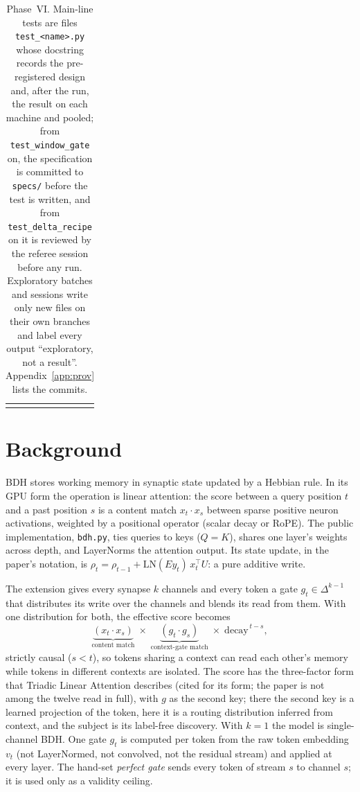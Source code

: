 \documentclass[11pt]{article}
\begin{document}
{\begin{longtable}{@{}l>{\raggedright\arraybackslash}p{0.27\linewidth}>{\raggedright\arraybackslash}p{0.36\linewidth}r@{}}
\bottomrule
\caption{Phase~VI. Main-line tests are files \texttt{test\_<name>.py} whose docstring records the pre-registered design and, after the run, the result on each machine and pooled; from \texttt{test\_window\_gate} on, the specification is committed to \texttt{specs/} before the test is written, and from \texttt{test\_delta\_recipe} on it is reviewed by the referee session before any run. Exploratory batches and sessions write only new files on their own branches and label every output ``exploratory, not a result''. Appendix~\ref{app:prov} lists the commits.}
\label{tab:index}
\end{longtable}}

\section{Background}
\label{sec:background}

BDH \cite{bdh} stores working memory in synaptic state updated by a Hebbian rule. In its GPU form the operation is linear attention: the score between a query position $t$ and a past position $s$ is a content match $x_t \cdot x_s$ between sparse positive neuron activations, weighted by a positional operator (scalar decay or RoPE). The public implementation, \texttt{bdh.py}, ties queries to keys ($Q = K$), shares one layer's weights across depth, and LayerNorms the attention output. Its state update, in the paper's notation, is $\rho_{t} = \rho_{t-1} + \mathrm{LN}(E y_{t})\, x_{t}^{\top} U$: a pure additive write.

The extension gives every synapse $k$ channels and every token a gate $g_t \in \Delta^{k-1}$ that distributes its write over the channels and blends its read from them. With one distribution for both, the effective score becomes
\begin{equation}
\underbrace{(x_t \cdot x_s)}_{\text{content match}}\;\times\;\underbrace{(g_t \cdot g_s)}_{\text{context-gate match}}\;\times\;\mathrm{decay}^{\,t-s},
\label{eq:score}
\end{equation}
strictly causal ($s < t$), so tokens sharing a context can read each other's memory while tokens in different contexts are isolated. The score has the three-factor form that Triadic Linear Attention \cite{tla} describes (cited for its form; the paper is not among the twelve read in full), with $g$ as the second key; there the second key is a learned projection of the token, here it is a routing distribution inferred from context, and the subject is its label-free discovery. With $k = 1$ the model is single-channel BDH. One gate $g_t$ is computed per token from the raw token embedding $v_t$ (not LayerNormed, not convolved, not the residual stream) and applied at every layer. The hand-set \emph{perfect gate} sends every token of stream $s$ to channel $s$; it is used only as a validity ceiling.
\end{document}

